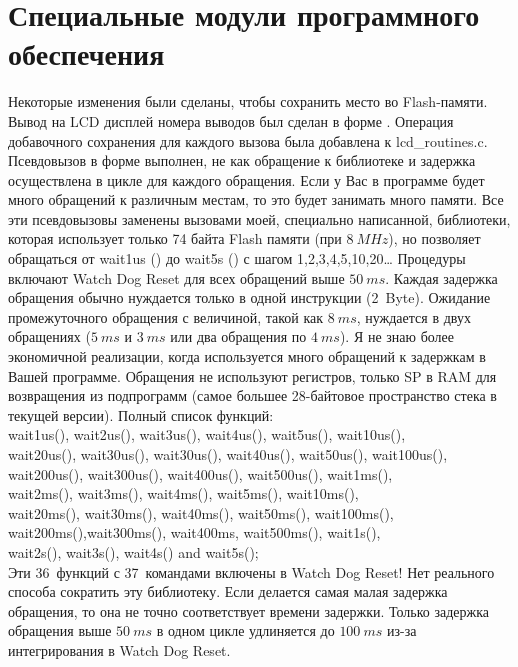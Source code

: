 
\chapter{Специальные модули программного обеспечения}

Некоторые изменения были сделаны, чтобы сохранить место во Flash-памяти. Вывод на LCD дисплей номера выводов был 
сделан в форме .
Операция добавочного сохранения для каждого вызова 
была добавлена к  lcd\_routines.c.\\

Псевдовызов в форме  выполнен, не как обращение к библиотеке и задержка осуществлена в цикле 
для каждого обращения. Если у Вас в программе будет много обращений к различным местам, то это будет занимать много 
памяти. Все эти псевдовызовы заменены вызовами моей, специально написанной, библиотеки, которая использует только 
74 байта Flash памяти (при \(8~MHz\)), но позволяет обращаться от wait1us () до wait5s () с 
шагом 1,2,3,4,5,10,20\dots 
Процедуры включают Watch Dog Reset для всех обращений выше \(50~ms\). Каждая  задержка обращения обычно  нуждается 
только в одной инструкции (2~Byte). Ожидание промежуточного обращения с величиной, такой как \(8~ms\), нуждается  
в двух обращениях (\(5~ms\) и \(3~ms\) или два обращения по \(4~ms\)). Я не знаю более экономичной реализации, 
когда используется много обращений  к задержкам в Вашей программе. Обращения не используют регистров, только SP 
в RAM для возвращения из подпрограмм (самое большее 28-байтовое пространство стека в текущей версии). Полный 
список функций:\\
wait1us(), wait2us(), wait3us(), wait4us(), wait5us(), wait10us(), \\
wait20us(), wait30us(), wait30us(), wait40us(), wait50us(), wait100us(), \\
wait200us(), wait300us(), wait400us(), wait500us(), wait1ms(),\\
wait2ms(), wait3ms(), wait4ms(), wait5ms(), wait10ms(),\\
wait20ms(), wait30ms(), wait40ms(), wait50ms(), wait100ms(),\\
wait200ms(),wait300ms(), wait400ms, wait500ms(), wait1s(),\\
wait2s(), wait3s(), wait4s() and wait5s();\\
Эти 36~функций с 37~командами включены в Watch Dog Reset! Нет реального способа сократить эту библиотеку. Если 
делается самая малая задержка обращения, то она не точно соответствует времени задержки. Только задержка обращения 
выше \(50~ms\) в одном цикле удлиняется до \(100~ms\) из-за интегрирования в Watch Dog Reset.\\

